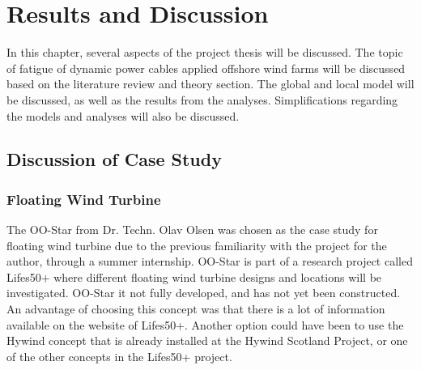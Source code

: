 \chapter{Results and Discussion}
\label{chap:discussion}
 In this chapter, several aspects of the project thesis will be discussed. The topic of fatigue of dynamic power cables applied offshore wind farms will be discussed based on the literature review and theory section. The global and local model will be discussed, as well as the results from the analyses. Simplifications regarding the models and analyses will also be discussed. 
 \section{Discussion of Case Study}
 \subsection{Floating Wind Turbine}
The OO-Star from Dr. Techn. Olav Olsen was chosen as the case study for floating wind turbine due to the previous familiarity with the project for the author, through a summer internship. OO-Star is part of a research project called Lifes50+ where different floating wind turbine designs and locations will be investigated. OO-Star it not fully developed, and has not yet been constructed. An advantage of choosing this concept was that there is a lot of information available on the website of Lifes50+. Another option could have been to use the Hywind concept that is already installed at the Hywind Scotland Project, or one of the other concepts in the Lifes50+ project.
